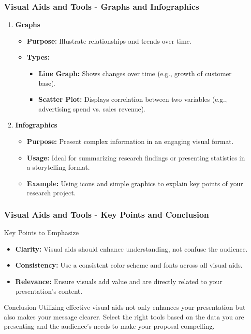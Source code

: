 \documentclass[aspectratio=169]{beamer}
\begin{document}
\begin{frame}[fragile]
    \frametitle{Visual Aids and Tools - Graphs and Infographics}
    \begin{enumerate}[resume]
        \item \textbf{Graphs}
        \begin{itemize}
            \item \textbf{Purpose:} Illustrate relationships and trends over time.
            \item \textbf{Types:}
            \begin{itemize}
                \item \textbf{Line Graph:} Shows changes over time (e.g., growth of customer base).
                \item \textbf{Scatter Plot:} Displays correlation between two variables (e.g., advertising spend vs. sales revenue).
            \end{itemize}
        \end{itemize}

        \item \textbf{Infographics}
        \begin{itemize}
            \item \textbf{Purpose:} Present complex information in an engaging visual format.
            \item \textbf{Usage:} Ideal for summarizing research findings or presenting statistics in a storytelling format.
            \item \textbf{Example:} Using icons and simple graphics to explain key points of your research project.
        \end{itemize}
    \end{enumerate}
\end{frame}

\begin{frame}[fragile]
    \frametitle{Visual Aids and Tools - Key Points and Conclusion}
    \begin{block}{Key Points to Emphasize}
        \begin{itemize}
            \item \textbf{Clarity:} Visual aids should enhance understanding, not confuse the audience.
            \item \textbf{Consistency:} Use a consistent color scheme and fonts across all visual aids.
            \item \textbf{Relevance:} Ensure visuals add value and are directly related to your presentation's content.
        \end{itemize}
    \end{block}

    \begin{block}{Conclusion}
        Utilizing effective visual aids not only enhances your presentation but also makes your message clearer. Select the right tools based on the data you are presenting and the audience’s needs to make your proposal compelling.
    \end{block}
\end{frame}
\end{document}
